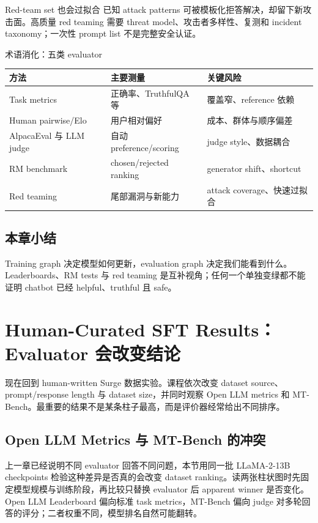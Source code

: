 \documentclass[a4paper]{article}
\begin{document}
\begin{warningbox}{Red-team set 也会过拟合}
已知 attack patterns 可被模板化拒答解决，却留下新攻击面。高质量 red teaming 需要 threat model、攻击者多样性、复测和 incident taxonomy；一次性 prompt list 不是完整安全认证。
\end{warningbox}

\begin{knowledgebox}{术语消化：五类 evaluator}
\begin{tabularx}{\textwidth}{@{}L{0.17\textwidth}L{0.24\textwidth}X@{}}
\toprule
方法 & 主要测量 & 关键风险 \\
\midrule
Task metrics & 正确率、TruthfulQA 等 & 覆盖窄、reference 依赖 \\
Human pairwise/Elo & 用户相对偏好 & 成本、群体与顺序偏差 \\
AlpacaEval 与 LLM judge & 自动 preference/scoring & judge style、数据耦合 \\
RM benchmark & chosen/rejected ranking & generator shift、shortcut \\
Red teaming & 尾部漏洞与新能力 & attack coverage、快速过拟合 \\
\bottomrule
\end{tabularx}
\end{knowledgebox}

\subsection{本章小结}

Training graph 决定模型如何更新，evaluation graph 决定我们能看到什么。Leaderboards、RM tests 与 red teaming 是互补视角；任何一个单独变绿都不能证明 chatbot 已经 helpful、truthful 且 safe。

\section{Human-Curated SFT Results：Evaluator 会改变结论}

现在回到 human-written Surge 数据实验。课程依次改变 dataset source、prompt/response length 与 dataset size，并同时观察 Open LLM metrics 和 MT-Bench。最重要的结果不是某条柱子最高，而是评价器经常给出不同排序。

\subsection{Open LLM Metrics 与 MT-Bench 的冲突}

上一章已经说明不同 evaluator 回答不同问题，本节用同一批 LLaMA-2-13B checkpoints 检验这种差异是否真的会改变 dataset ranking。读两张柱状图时先固定模型规模与训练阶段，再比较只替换 evaluator 后 apparent winner 是否变化。Open LLM Leaderboard 偏向标准 task metrics，MT-Bench 偏向 judge 对多轮回答的评分；二者权重不同，模型排名自然可能翻转。
\end{document}
